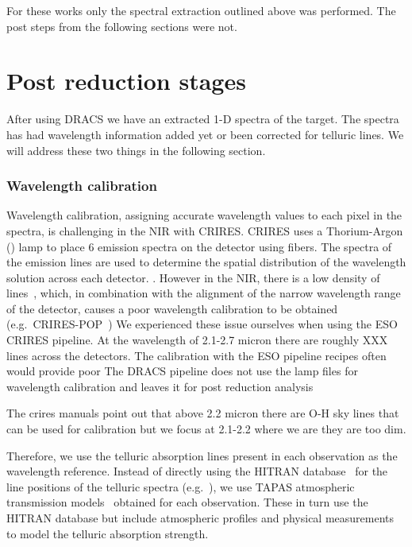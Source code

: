 For these works only the spectral extraction outlined above was performed. The post  steps from the following sections were not.



\section{Post reduction stages}
\label{sec:posreduction}
After using DRACS we have an extracted 1-D spectra of the target. The spectra has had wavelength information added yet or been corrected for telluric lines. We will address these two things in the following section.

\subsubsection{Wavelength calibration}
\label{subsec:wavcalib}
Wavelength calibration, assigning accurate wavelength values to each pixel in the spectra, is challenging in the NIR with CRIRES. CRIRES uses a Thorium-Argon (\thar) lamp to place 6 emission spectra on the detector using fibers. The spectra of the \thar emission lines are used to determine the spatial distribution of the wavelength solution across each detector. . However in the NIR, there is a low density of \thar lines~\citep{kerber_laboratory_2009}, which, in combination with the alignment of the narrow wavelength range of the detector, causes a poor wavelength calibration to be obtained (e.g.\ CRIRES-POP~\citep{nicholls_crirespop_2017})
We experienced these issue ourselves when using the ESO CRIRES pipeline. At the wavelength of 2.1-2.7 micron there are roughly XXX \thar lines across the detectors.
The calibration with the ESO pipeline recipes often would provide poor The DRACS pipeline does not use the \thar lamp files for wavelength calibration and leaves it for post reduction analysis

The crires manuals point out that above 2.2 micron there are O-H sky lines that can be used for calibration but we focus at 2.1-2.2 where we are they are too dim.
 
Therefore, we use the telluric absorption lines present in each observation as the wavelength reference. Instead of directly using the HITRAN database~\citep{rothman_hitran2012_2013} for the line positions of the telluric spectra (e.g.~\citep{brogi_signature_2012,brogi_carbon_2014,dekok_detection_2013}), we use TAPAS atmospheric transmission models~\citep{bertaux_tapas_2014} obtained for each observation. These in turn use the HITRAN database but include atmospheric profiles and physical measurements to model the telluric absorption strength.

